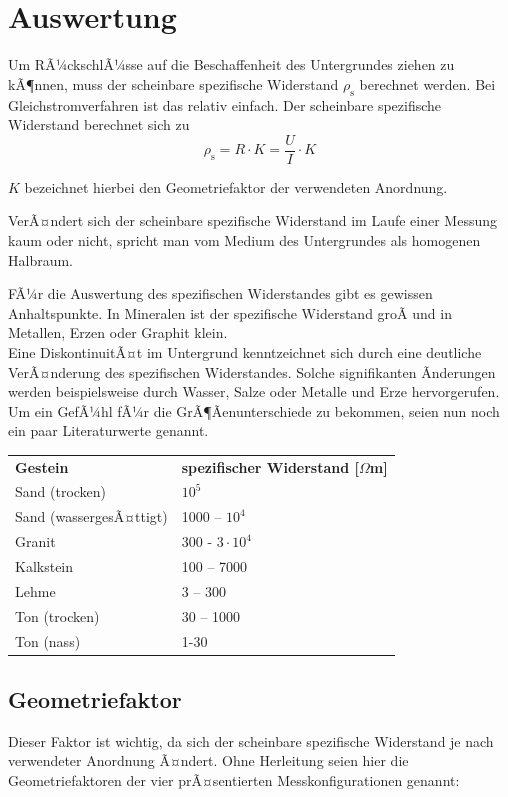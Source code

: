 \section{Auswertung}
Um RÃ¼ckschlÃ¼sse auf die Beschaffenheit des Untergrundes ziehen zu kÃ¶nnen, muss der scheinbare spezifische Widerstand $\rho_{\text{s}}$ berechnet werden. 
Bei Gleichstromverfahren ist das relativ einfach. Der scheinbare spezifische Widerstand berechnet sich zu \begin{equation*}
	\rho_{\text{s}} = R \cdot K = \frac{U}{I} \cdot K
\end{equation*}

$K$ bezeichnet hierbei den Geometriefaktor der verwendeten Anordnung.

VerÃ¤ndert sich der scheinbare spezifische Widerstand im Laufe einer Messung kaum oder nicht, spricht man vom Medium des Untergrundes als homogenen Halbraum. 

FÃ¼r die Auswertung des spezifischen Widerstandes gibt es gewissen Anhaltspunkte. In Mineralen ist der spezifische Widerstand groÃ und in Metallen, Erzen oder Graphit klein. \\
Eine DiskontinuitÃ¤t im Untergrund kenntzeichnet sich durch eine deutliche VerÃ¤nderung des spezifischen Widerstandes. Solche signifikanten Ãnderungen werden beispielsweise durch Wasser, Salze oder Metalle und Erze hervorgerufen. Um ein GefÃ¼hl fÃ¼r die GrÃ¶Ãenunterschiede zu bekommen, seien nun noch ein paar Literaturwerte genannt. 

\begin{tabular}{ll}
	\textbf{Gestein} & \textbf{spezifischer Widerstand [$\Omega$m]} \\
	Sand (trocken) & $10^5$ \\
	Sand (wassergesÃ¤ttigt) & 1000 -- $10^4$ \\
	Granit & 300 - $3 \cdot 10^4$ \\
	Kalkstein & 100 -- 7000 \\
	Lehme & 3 -- 300 \\
	Ton (trocken) & 30 -- 1000 \\
	Ton (nass) & 1-30
\end{tabular}  

\subsection{Geometriefaktor}
Dieser Faktor ist wichtig, da sich der scheinbare spezifische Widerstand je nach verwendeter Anordnung Ã¤ndert. Ohne Herleitung seien hier die Geometriefaktoren der vier prÃ¤sentierten Messkonfigurationen genannt:

